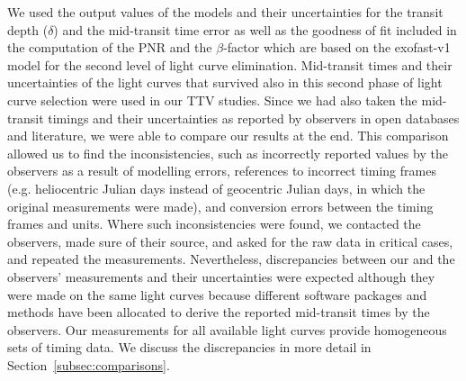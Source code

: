\documentclass[a4paper,fleqn,usenatbib]{mnras}
\begin{document}
We used the output values of the models and their uncertainties for the transit depth ($\delta$) and the mid-transit time error as well as the goodness of fit included in the computation of the PNR and the $\beta$-factor  which are based on the {\sc exofast}-v1 model for the second level of light curve elimination. Mid-transit times and their uncertainties of the light curves that survived also in this second phase of light curve selection were used in our TTV studies. Since we had also taken the mid-transit timings and their uncertainties as reported by observers in open databases and literature, we were able to compare our results at the end. This comparison allowed us to find the inconsistencies, such as incorrectly reported values by the observers as a result of modelling errors, references to incorrect timing frames (e.g. heliocentric Julian days instead of geocentric Julian days, in which the original measurements were made), and conversion errors between the timing frames and units. Where such inconsistencies were found, we contacted the observers, made sure of their source, and asked for the raw data in critical cases, and repeated the measurements. Nevertheless, discrepancies between our and the observers' measurements and their uncertainties were expected although they were made on the same light curves because different software packages and methods have been allocated to derive the reported mid-transit times by the observers. Our measurements for all available light curves provide homogeneous sets of timing data. We discuss the discrepancies in more detail in Section~\ref{subsec:comparisons}.
\end{document}
